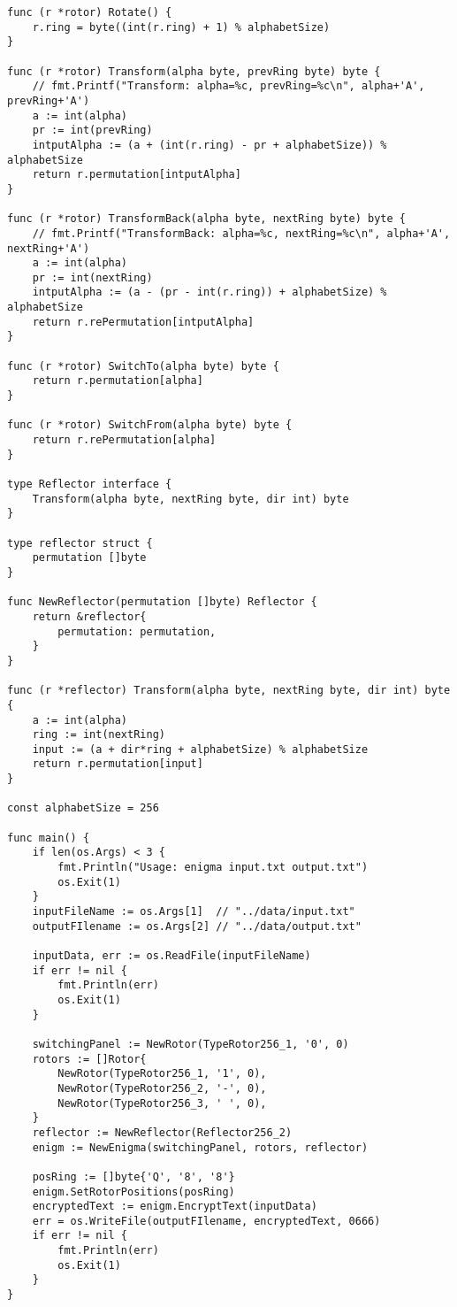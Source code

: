 \begin{lstlisting}[style=golang, caption={Реализация электронного аналога шифровальной машины «Энигма»}, label=lst:codegolang]
func (r *rotor) Rotate() {
	r.ring = byte((int(r.ring) + 1) % alphabetSize)
}

func (r *rotor) Transform(alpha byte, prevRing byte) byte {
	// fmt.Printf("Transform: alpha=%c, prevRing=%c\n", alpha+'A', prevRing+'A')
	a := int(alpha)
	pr := int(prevRing)
	intputAlpha := (a + (int(r.ring) - pr + alphabetSize)) % alphabetSize
	return r.permutation[intputAlpha]
}

func (r *rotor) TransformBack(alpha byte, nextRing byte) byte {
	// fmt.Printf("TransformBack: alpha=%c, nextRing=%c\n", alpha+'A', nextRing+'A')
	a := int(alpha)
	pr := int(nextRing)
	intputAlpha := (a - (pr - int(r.ring)) + alphabetSize) % alphabetSize
	return r.rePermutation[intputAlpha]
}

func (r *rotor) SwitchTo(alpha byte) byte {
	return r.permutation[alpha]
}

func (r *rotor) SwitchFrom(alpha byte) byte {
	return r.rePermutation[alpha]
}

type Reflector interface {
	Transform(alpha byte, nextRing byte, dir int) byte
}

type reflector struct {
	permutation []byte
}

func NewReflector(permutation []byte) Reflector {
	return &reflector{
		permutation: permutation,
	}
}

func (r *reflector) Transform(alpha byte, nextRing byte, dir int) byte {
	a := int(alpha)
	ring := int(nextRing)
	input := (a + dir*ring + alphabetSize) % alphabetSize
	return r.permutation[input]
}

const alphabetSize = 256

func main() {
	if len(os.Args) < 3 {
		fmt.Println("Usage: enigma input.txt output.txt")
		os.Exit(1)
	}
	inputFileName := os.Args[1]  // "../data/input.txt"
	outputFIlename := os.Args[2] // "../data/output.txt"
	
	inputData, err := os.ReadFile(inputFileName)
	if err != nil {
		fmt.Println(err)
		os.Exit(1)
	}
	
	switchingPanel := NewRotor(TypeRotor256_1, '0', 0)
	rotors := []Rotor{
		NewRotor(TypeRotor256_1, '1', 0),
		NewRotor(TypeRotor256_2, '-', 0),
		NewRotor(TypeRotor256_3, ' ', 0),
	}
	reflector := NewReflector(Reflector256_2)
	enigm := NewEnigma(switchingPanel, rotors, reflector)
	
	posRing := []byte{'Q', '8', '8'}
	enigm.SetRotorPositions(posRing)
	encryptedText := enigm.EncryptText(inputData)
	err = os.WriteFile(outputFIlename, encryptedText, 0666)
	if err != nil {
		fmt.Println(err)
		os.Exit(1)
	}
}

\end{lstlisting}


